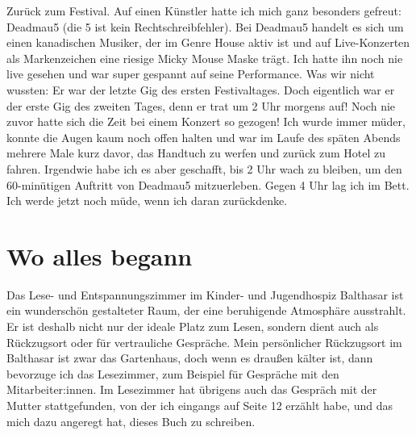 \documentclass[fontsize=14pt,a4paper,headinclude,DIV=calc,automark]{scrbook}
\begin{document}
Zurück zum Festival. Auf einen Künstler hatte ich mich ganz besonders gefreut: Deadmau5 (die 5 ist kein Rechtschreibfehler). Bei Deadmau5 handelt es sich um einen kanadischen Musiker, der im Genre House aktiv ist und auf Live-Konzerten als Markenzeichen eine riesige Micky Mouse Maske trägt. Ich hatte ihn noch nie live gesehen und war super gespannt auf seine Performance. Was wir nicht wussten: Er war der letzte Gig des ersten Festivaltages. Doch eigentlich war er der erste Gig des zweiten Tages, denn er trat um 2 Uhr morgens auf! Noch nie zuvor hatte sich die Zeit bei einem Konzert so gezogen! Ich wurde immer müder, konnte die Augen kaum noch offen halten und war im Laufe des späten Abends mehrere Male kurz davor, das Handtuch zu werfen und zurück zum Hotel zu fahren. Irgendwie habe ich es aber geschafft, bis 2 Uhr wach zu bleiben, um den 60-minütigen Auftritt von Deadmau5 mitzuerleben. Gegen 4 Uhr lag ich im Bett. Ich werde jetzt noch müde, wenn ich daran zurückdenke.

\section{Wo alles begann}

Das Lese- und Entspannungszimmer im Kinder- und Jugendhospiz Balthasar ist ein wunderschön gestalteter Raum, der eine beruhigende Atmosphäre ausstrahlt. Er ist deshalb nicht nur der ideale Platz zum Lesen, sondern dient auch als Rückzugsort oder für vertrauliche Gespräche. Mein persönlicher Rückzugsort im Balthasar ist zwar das Gartenhaus, doch wenn es draußen kälter ist, dann bevorzuge ich das Lesezimmer, zum Beispiel für Gespräche mit den Mitarbeiter:innen. Im Lesezimmer hat übrigens auch das Gespräch mit der Mutter stattgefunden, von der ich eingangs auf Seite 12 erzählt habe, und das mich dazu angeregt hat, dieses Buch zu schreiben.
\end{document}
